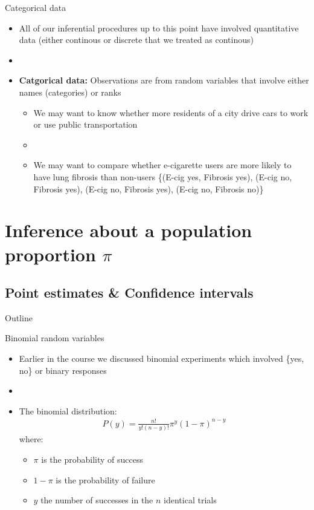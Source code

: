 \documentclass[xcolor=dvipsnames]{beamer}
\begin{document}
\begin{frame}{Categorical data}
	\begin{itemize}
		\item All of our inferential procedures up to this point have involved quantitative data (either continous or discrete that we treated as continous)
		\item[]
		\item \textbf{Catgorical data:} Observations are from random variables that involve either names (categories) or ranks
		\begin{itemize}
			\item We may want to know whether more residents of a city drive cars to work or use public transportation \pause
			\item[]
			\item We may want to compare whether e-cigarette users are more likely to have lung fibrosis than non-users \{(E-cig yes, Fibrosis yes), (E-cig no, Fibrosis yes), (E-cig no, Fibrosis yes), (E-cig no, Fibrosis no)\}
		\end{itemize}
	\end{itemize}
\end{frame}

\section{Inference about a population proportion $\pi$}
\subsection{Point estimates \& Confidence intervals}

\begin{frame}{Outline}
	\tableofcontents[currentsection,subsectionstyle=show/shaded/hide]
\end{frame}

\begin{frame}{Binomial random variables}
	\begin{itemize}
		\item Earlier in the course we discussed binomial experiments which involved \{yes, no\} or binary responses \pause
		\item[]
		\item The binomial distribution:
		\begin{gather*}
		P(y) = \frac{n!}{y! (n - y)!} \pi^y (1-\pi)^{n-y}
		\end{gather*} \pause
		where:
		\begin{itemize}
			\item $\pi$ is the probability of success \pause
			\item $1-\pi$ is the probability of failure \pause
			\item $y$ the number of successes in the $n$ identical trials
		\end{itemize}
	\end{itemize}
\end{frame}
\end{document}
